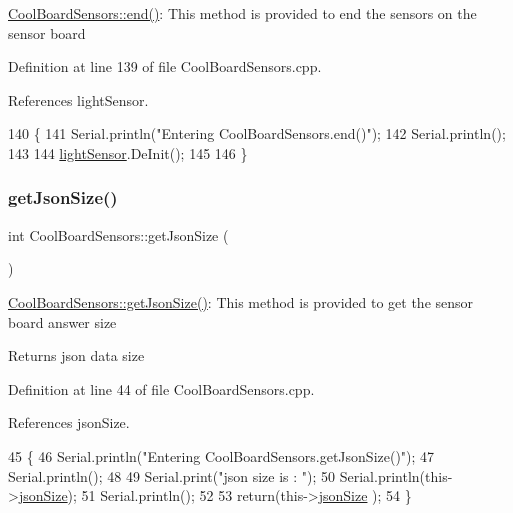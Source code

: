 \hyperlink{classCoolBoardSensors_a4902b69f6e628bd6557193758fdd2bae}{Cool\+Board\+Sensors\+::end()}\+: This method is provided to end the sensors on the sensor board 

Definition at line 139 of file Cool\+Board\+Sensors.\+cpp.



References light\+Sensor.


\begin{DoxyCode}
140 \{
141     Serial.println(\textcolor{stringliteral}{"Entering CoolBoardSensors.end()"});
142     Serial.println();
143 
144     \hyperlink{classCoolBoardSensors_a3e397300fb707dd193e909a757bf6102}{lightSensor}.DeInit();
145 
146 \}
\end{DoxyCode}
\mbox{\label{classCoolBoardSensors_ab82c2a1633768ccd12a589320fa31a14}} 
\subsubsection{\texorpdfstring{get\+Json\+Size()}{getJsonSize()}}
{\footnotesize\ttfamily int Cool\+Board\+Sensors\+::get\+Json\+Size (\begin{DoxyParamCaption}{ }\end{DoxyParamCaption})}

\hyperlink{classCoolBoardSensors_ab82c2a1633768ccd12a589320fa31a14}{Cool\+Board\+Sensors\+::get\+Json\+Size()}\+: This method is provided to get the sensor board answer size

\begin{DoxyReturn}{Returns}
json data size 
\end{DoxyReturn}


Definition at line 44 of file Cool\+Board\+Sensors.\+cpp.



References json\+Size.


\begin{DoxyCode}
45 \{
46     Serial.println(\textcolor{stringliteral}{"Entering CoolBoardSensors.getJsonSize()"});
47     Serial.println();
48 
49     Serial.print(\textcolor{stringliteral}{"json size is : "});
50     Serial.println(this->\hyperlink{classCoolBoardSensors_a05a40dc80bfff14ffb830f549b876f8d}{jsonSize});
51     Serial.println();
52 
53     \textcolor{keywordflow}{return}(this->\hyperlink{classCoolBoardSensors_a05a40dc80bfff14ffb830f549b876f8d}{jsonSize} );
54 \}
\end{DoxyCode}
\mbox{\label{classCoolBoardSensors_acad6a8418c66d36868caca23c844ecb6}} 
